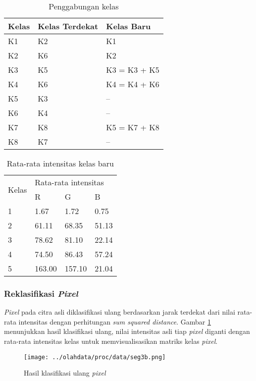 \documentclass[laporan.tex]{subfiles}
\begin{document}
\begin{table}[h]
\centering
\begin{tabular}{|l|l|l|}
\hline
Kelas & Kelas Terdekat & Kelas Baru \\
\hline
K1 & K2 & K1 \\
K2 & K6 & K2 \\
K3 & K5 & K3 = K3 + K5 \\
K4 & K6 & K4 = K4 + K6 \\
K5 & K3 & -- \\
K6 & K4 & -- \\
K7 & K8 & K5 = K7 + K8 \\
K8 & K7 & -- \\
\hline
\end{tabular}
\caption{Penggabungan kelas}
\label{table:newclass}
\end{table}

\begin{table}[h]
\centering
\begin{tabular}{|l|l|l|l|}
\cline{1-4}
\multirow{2}{*}{Kelas} & \multicolumn{3}{l|}{Rata-rata intensitas} \\
\cline{2-4}
 & R & G & B \\
\cline{1-4}
1 & 1.67 & 1.72 & 0.75 \\
2 & 61.11 & 68.35 & 51.13 \\
3 & 78.62 & 81.10 & 22.14 \\
4 & 74.50 & 86.43 & 57.24 \\
5 & 163.00 & 157.10 & 21.04 \\
\cline{1-4}
\end{tabular}
\caption{Rata-rata intensitas kelas baru}
\label{table:newclassavg}
\end{table}

\subsubsection{Reklasifikasi \emph{Pixel}}

\emph{Pixel} pada citra asli diklasifikasi ulang berdasarkan jarak terdekat dari nilai rata-rata intensitas dengan perhitungan \emph{sum squared distance}. Gambar \ref{fig:classfinimg} menunjukkan hasil klasifikasi ulang, nilai intensitas asli tiap \emph{pixel} diganti dengan rata-rata intensitas kelas untuk memvisualisasikan matriks kelas \emph{pixel}.

\begin{figure}[h]
\centering
\texttt{[image: ../olahdata/proc/data/seg3b.png]}
\caption{Hasil klasifikasi ulang \emph{pixel}}
\label{fig:classfinimg}
\end{figure}
\end{document}
